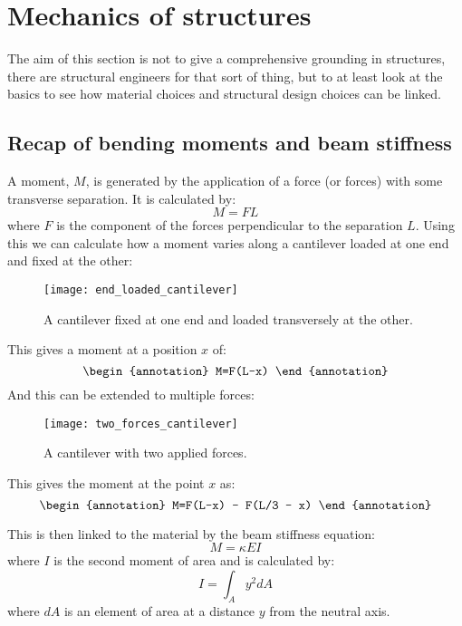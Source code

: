 \clearpage

\section{Mechanics of structures}

The aim of this section is not to give a comprehensive grounding in structures, there are structural engineers for that sort of thing, but to at least look at the basics to see how material choices and structural design choices can be linked.

\subsection{Recap of bending moments and beam stiffness}

A moment, $M$, is generated by the application of a force (or forces) with some transverse separation. It is calculated by:
\begin{equation}
M = FL
\end{equation}
where $F$ is the component of the forces perpendicular to the separation $L$. Using this we can calculate how a moment varies along a cantilever loaded at one end and fixed at the other:

\FloatBarrier
\begin{figure}[h!]
\centering
\texttt{[image: end\_loaded\_cantilever]}
\caption{A cantilever fixed at one end and loaded transversely at the other.\label{fig:simple_cantilever}}
\end{figure}
\FloatBarrier

This gives a moment at a position $x$ of:
\begin{equation}
\begin{annotation}
M=F(L-x)
\end{annotation}
\end{equation}
And this can be extended to multiple forces:
\FloatBarrier
\begin{figure}
\centering
\texttt{[image: two\_forces\_cantilever]}
\caption{A cantilever with two applied forces.}
\end{figure}
\FloatBarrier
This gives the moment at the point $x$ as:
\begin{equation}
\begin{annotation}
M=F(L-x) - F(L/3 - x)
\end{annotation}
\end{equation}

This is then linked to the material by the beam stiffness equation:
\begin{equation}
M=\kappa EI \label{eqn:beam_bending}
\end{equation}
where $I$ is the second moment of area and is calculated by:
\begin{equation}
 I = \int_A y^2 dA 
\end{equation}
where $dA$ is an element of area at a distance $y$ from the neutral axis.

